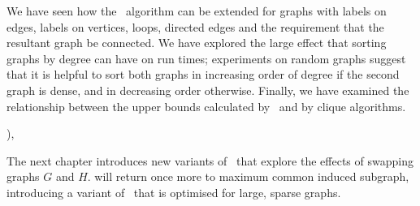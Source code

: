 We have
seen how the \McSplit\ algorithm can be extended for graphs with labels on edges, labels
on vertices, loops, directed edges and the requirement that the resultant graph
be connected.  We have explored the large effect that sorting graphs
by degree can have on run times; experiments on random graphs suggest that
it is helpful to sort both graphs in increasing order of degree if the
second graph is dense, and in decreasing order otherwise.
Finally, we have examined the relationship between the upper bounds
calculated by \McSplit\ and by clique algorithms.

 \citet{dilkas2018}), 

The next chapter introduces new variants of \McSplit\ that explore the effects
of swapping graphs $G$ and $H$.  
 will return once more to maximum common induced subgraph,
introducing a variant of \McSplit\ that is optimised for large, sparse graphs.



